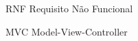 \begin{siglas}
  \item[RNF] Requisito Não Funcional
  \item[MVC] Model-View-Controller
\end{siglas}
